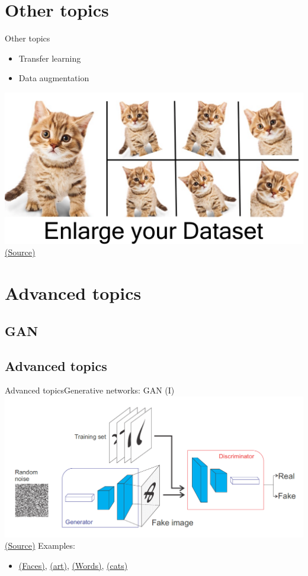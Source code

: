 \documentclass[10pt,compress]{beamer} %
\begin{document}
\section{Other topics}
\begin{frame}{Other topics}
	\begin{itemize}
		\item Transfer learning
		\item Data augmentation
	\end{itemize}

	\centering\includegraphics[width=0.5\linewidth]{figs/augmentation.png}\\
	\scriptsize\href{https://medium.com/nanonets/how-to-use-deep-learning-when-you-have-limited-data-part-2-data-augmentation-c26971dc8ced}{(Source)}
\end{frame}

\section{Advanced topics}

\subsection{GAN}

\subsection{Advanced topics}
\begin{frame}{Advanced topics}{Generative networks: GAN (I)}
	\centering\includegraphics[width=0.7\linewidth]{figs/gan.png}\\
	\scriptsize\href{https://www.oreilly.com/library/view/java-deep-learning/9781788997454/60579068-af4b-4bbf-83f1-e988fbe3b226.xhtml}{(Source)}
   Examples:
    \begin{itemize}
        \item \href{https://www.nvidia.com/en-us/studio/canvas/}{(Faces)}, \href{https://thisartworkdoesnotexist.com/}{(art)}, \href{http://www.thisworddoesnotexist.com/}{(Words)}, \href{https://thesecatsdonotexist.com/}{(cats)}
    \end{itemize}
    
\end{frame}
\end{document}
